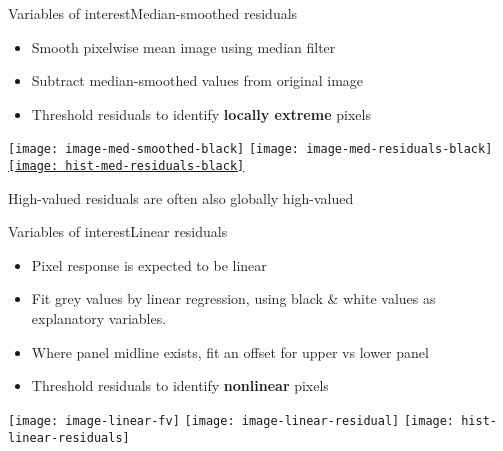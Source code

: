\documentclass[8pt]{beamer}
\begin{document}

\begin{frame}[label = ms-res]{Variables of interest}{Median-smoothed residuals}
	\begin{itemize}
		\item Smooth pixelwise mean image using median filter
		\item Subtract median-smoothed values from original image
		\item Threshold residuals to identify \textbf{locally extreme} pixels		%
	\end{itemize}
	\begin{center}
		\texttt{[image: image-med-smoothed-black]}
		\texttt{[image: image-med-residuals-black]}
		\hyperlink{ms-res-supplemental}{\texttt{[image: hist-med-residuals-black]}}
	\end{center}
	High-valued residuals are often also globally high-valued
\end{frame}
 
 
\begin{frame}{Variables of interest}{Linear residuals}
	\begin{itemize}
		\item Pixel response is expected to be linear 		%
		\item Fit grey values by linear regression, using black \& white values as explanatory variables. \\
		\item Where panel midline exists, fit an offset for upper vs lower panel
		\item Threshold residuals to identify \textbf{nonlinear} pixels
	\end{itemize}		

	\begin{center}
		\texttt{[image: image-linear-fv]}
		\texttt{[image: image-linear-residual]}
		\texttt{[image: hist-linear-residuals]}
	\end{center}
	
\end{frame}
	
\end{document}
